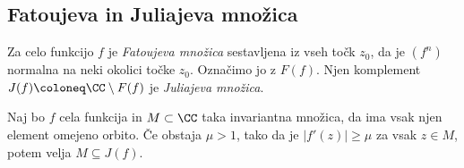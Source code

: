 \subsection{Fatoujeva in Juliajeva množica}

Za celo funkcijo \(f\) je \emph{Fatoujeva množica} sestavljena iz vseh točk \(z_0\), da je \((f^n)\) normalna na neki okolici točke \(z_0\). Označimo jo z \(F (f)\). Njen komplement \(J (f) \coloneq \CC \setminus F (f)\) je \emph{Juliajeva množica}.

\begin{izrek} \label{thm:julm}
    Naj bo \(f\) cela funkcija in \(M \subset \CC\) taka invariantna množica, da ima vsak njen element omejeno orbito. Če obstaja \(\mu > 1\), tako da je \(|f' (z)| \geq \mu\) za vsak \(z \in M\), potem velja \(M \subseteq J (f)\).
\end{izrek}
